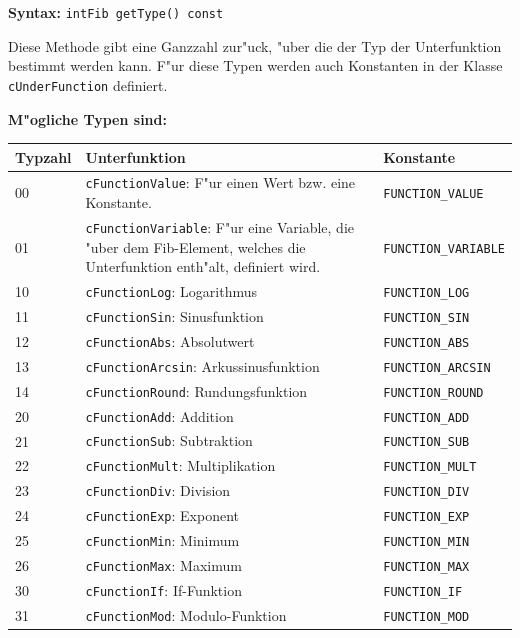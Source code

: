 \textbf{Syntax:} \verb|intFib getType() const|

\bigskip\noindent
Diese Methode gibt eine Ganzzahl zur"uck, "uber die der Typ der Unterfunktion bestimmt werden kann. F"ur diese Typen werden auch Konstanten in der Klasse \verb|cUnderFunction| definiert.

\bigskip\noindent
\textbf{M"ogliche Typen sind:}

\noindent
\begin{tabular}{|p{10mm}|p{60mm}|p{40mm}|}\hline
	Typ\-zahl & Unterfunktion & Konstante \\\hline\hline
	00 & \verb|cFunctionValue|: F"ur einen Wert bzw. eine Konstante. & \verb|FUNCTION_VALUE| \\\hline
	01 & \verb|cFunctionVariable|: F"ur eine Variable, die "uber dem Fib-Element, welches die Unterfunktion enth"alt, definiert wird. & \verb|FUNCTION_VARIABLE| \\\hline
	10 & \verb|cFunctionLog|: Logarithmus & \verb|FUNCTION_LOG| \\\hline
	11 & \verb|cFunctionSin|: Sinusfunktion & \verb|FUNCTION_SIN| \\\hline
	12 & \verb|cFunctionAbs|: Absolutwert & \verb|FUNCTION_ABS| \\\hline
	13 & \verb|cFunctionArcsin|: Arkussinusfunktion & \verb|FUNCTION_ARCSIN| \\\hline
	14 & \verb|cFunctionRound|: Rundungsfunktion & \verb|FUNCTION_ROUND| \\\hline
	20 & \verb|cFunctionAdd|: Addition & \verb|FUNCTION_ADD| \\\hline
	21 & \verb|cFunctionSub|: Subtraktion & \verb|FUNCTION_SUB| \\\hline
	22 & \verb|cFunctionMult|: Multiplikation & \verb|FUNCTION_MULT| \\\hline
	23 & \verb|cFunctionDiv|: Division & \verb|FUNCTION_DIV| \\\hline
	24 & \verb|cFunctionExp|: Exponent & \verb|FUNCTION_EXP| \\\hline
	25 & \verb|cFunctionMin|: Minimum & \verb|FUNCTION_MIN| \\\hline
	26 & \verb|cFunctionMax|: Maximum & \verb|FUNCTION_MAX| \\\hline
	30 & \verb|cFunctionIf|: If-Funktion & \verb|FUNCTION_IF| \\\hline
	31 & \verb|cFunctionMod|: Modulo-Funktion & \verb|FUNCTION_MOD| \\\hline
\end{tabular}


